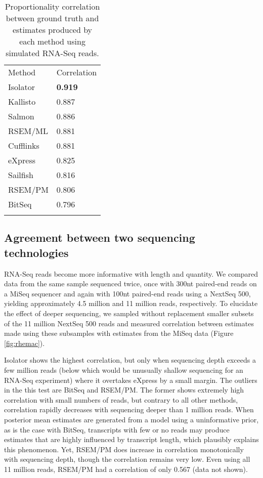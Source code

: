 \documentclass[twocolumn]{article}
\begin{document}
\begin{table}
\begin{tabular}[c]{@{}ll@{}}
\toprule\addlinespace
Method & Correlation
\\\addlinespace
\midrule
Isolator & \textbf{0.919}
\\\addlinespace
Kallisto & 0.887
\\\addlinespace
Salmon & 0.886
\\\addlinespace
RSEM/ML & 0.881
\\\addlinespace
Cufflinks & 0.881
\\\addlinespace
eXpress & 0.825
\\\addlinespace
Sailfish & 0.816
\\\addlinespace
RSEM/PM & 0.806
\\\addlinespace
BitSeq & 0.796
\\\addlinespace
\bottomrule
\addlinespace
\end{tabular}
\caption{
Proportionality correlation between ground truth and estimates
produced by each method using simulated RNA-Seq reads.}
\label{table:rlsim}
\end{table}


\subsection{Agreement between two sequencing
technologies}\label{agreement-between-two-sequencing-technologies}

RNA-Seq reads become more informative with length and quantity. We
compared data from the same sample sequenced twice, once with 300nt
paired-end reads on a MiSeq sequencer and again with 100nt paired-end
reads using a NextSeq 500, yielding approximately 4.5 million and 11
million reads, respectively. To elucidate the effect of deeper
sequencing, we sampled without replacement smaller subsets of the 11
million NextSeq 500 reads and measured correlation between estimates made using
these subsamples with estimates from the MiSeq data (Figure \ref{fig:rhemac}).

Isolator shows the highest correlation, but only when sequencing depth
exceeds a few million reads (below which would be unusually shallow
sequencing for an RNA-Seq experiment) where it overtakes eXpress by a small
margin. The outliers in the this test are BitSeq and RSEM/PM. The former
shows extremely high correlation with small numbers of reads, but
contrary to all other methods, correlation rapidly decreases with
sequencing deeper than 1 million reads. When posterior mean estimates are
generated from a model using a uninformative prior, as is the case with
BitSeq, transcripts with few or no reads may produce estimates that are
highly influenced by transcript length, which plausibly explains this
phenomenon. Yet, RSEM/PM does increase in correlation monotonically with
sequencing depth, though the correlation remains very low. Even using
all 11 million reads, RSEM/PM had a correlation of only 0.567 (data not shown).
\end{document}
